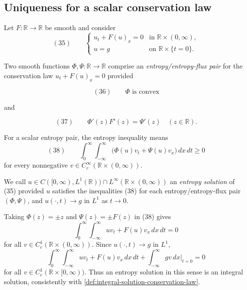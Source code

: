 \subsection{Uniqueness for a scalar conservation law}\label{sec:uniqueness-scalar-conservation-law-entropy}

Let $F:\mathbb R\to\mathbb R$ be smooth and consider
\[
(35)\qquad
\begin{cases}
u_t+F(u)_x=0 & \text{in }\mathbb R\times(0,\infty),\\
u=g & \text{on }\mathbb R\times\{t=0\}.
\end{cases}
\]

\begin{definition}
\label{def:entropy-entropy-flux-pair-scalar}
Two smooth functions $\Phi,\Psi:\mathbb{R}\to\mathbb{R}$ comprise an \textit{entropy/entropy-flux pair} for the conservation law $u_t + F(u)_x = 0$ provided

$$(36) \qquad \Phi \text{ is convex}$$

and

$$(37) \qquad \Phi'(z)F'(z) = \Psi'(z) \quad (z\in\mathbb{R}).$$
\end{definition}

For a scalar entropy pair, the entropy inequality means
\[
(38)\qquad
\int_0^\infty\!\int_{-\infty}^{\infty}
\bigl(\Phi(u)v_t+\Psi(u)v_x\bigr)\,dx\,dt\geq0
\]
for every nonnegative $v\in C_c^\infty(\mathbb R\times(0,\infty))$.

\begin{definition}
\label{def:entropy-solution-scalar-new}

We call $u\in C([0,\infty), L^1(\mathbb{R}))\cap L^\infty(\mathbb{R}\times(0,\infty))$ an \textit{entropy solution} of (35) provided $u$ satisfies the inequalities (38) for each entropy/entropy-flux pair $(\Phi,\Psi)$, and $u(\cdot,t)\to g$ in $L^1$ as $t\to 0$.
\end{definition}

\begin{remark}
\label{rem:entropy-solution-scalar-consistency}

Taking $\Phi(z)=\pm z$ and $\Psi(z)=\pm F(z)$ in (38) gives
$$\int_0^\infty\int_{-\infty}^\infty uv_t + F(u)v_x\,dx\,dt = 0$$
for all $v\in C_c^1(\mathbb{R}\times(0,\infty))$. Since $u(\cdot,t)\to g$ in $L^1$,
$$\int_0^\infty\int_{-\infty}^\infty uv_t + F(u)v_x\,dx\,dt + \int_{-\infty}^\infty gv\,dx\Big|_{t=0} = 0$$
for all $v\in C_c^1(\mathbb{R}\times[0,\infty))$. Thus an entropy solution in this sense is an integral solution, consistently with \cref{def:integral-solution-conservation-law}.
\end{remark}


